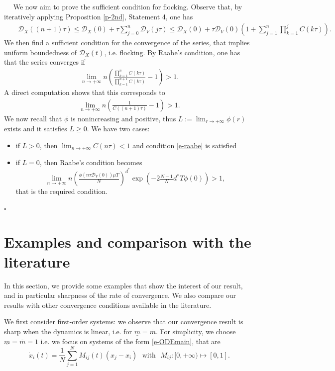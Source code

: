 \documentclass[journal]{article}
\newenvironment{proof}{{\it Proof.}~~}{\hfill$\square$}
\newcommand{\D}{\mathcal{D}}
\begin{document}
\begin{proof}
We now aim to prove the sufficient condition for flocking. Observe that, by iteratively applying Proposition \ref{p-2nd}, Statement 4, one has
\begin{eqnarray*}
&&\D_X((n+1)\tau)\leq \D_X(0)+\tau \sum_{j=0}^n \D_V(j\tau)\leq   \D_X(0)+\tau \D_V(0)\left(1+ \sum_{j=1}^n \prod_{k=1}^j C(k\tau)\right).
\end{eqnarray*}
We then find a sufficient condition for the convergence of the series, that implies uniform boundedness of $\D_X(t)$, i.e. flocking. By Raabe's condition, one has that the series converges if
\begin{eqnarray*}
\lim_{n\to+\infty} n\left(\frac{\prod_{k=1}^n C(k\tau)}{\prod_{k=1}^{n+1} C(k\tau)}-1\right)> 1.
\end{eqnarray*}
A direct computation shows that this corresponds to
\begin{eqnarray}
\label{Raabe-cond}
\lim_{n\to+\infty} n \left(\frac{1}{C((n+1)\tau )}-1\right)>1. \label{e-raabe}
\end{eqnarray}
We now recall that $\phi$ is nonincreasing and positive, thus $L:=\lim_{r\to+\infty} \phi(r)$ exists and it satisfies $L\geq 0$. We have two cases:
\begin{itemize}
\item if $L>0$, then $\lim_{n\to+\infty} C(n\tau )<1$ and condition \eqref{e-raabe} is satisfied
\item if $L=0$, then Raabe's condition becomes
\begin{equation}
\label{e-raabe-L0}
\lim_{n\to+\infty} n  \left( \tfrac{\phi(n\tau \D_V(0))\mu T}{N}    \right)^{d^*}\exp(-2\tfrac{N-1}{N}d^*T\phi(0))>1,
\end{equation}
that is the required condition.
\end{itemize}
\end{proof}

\section{Examples and comparison with the literature}

\label{s-examples}

In this section, we provide some examples that show the interest of our result, and in particular sharpness of the rate of convergence. We also compare our results with other convergence conditions available in the literature.

We first consider first-order systems: we observe that our convergence result is sharp when the dynamics is linear, i.e. for $\underline{m}=\overline{m}$. For simplicity, we choose $\underline{m}=\overline{m}=1$ i.e. we focus on systems of the form \eqref{e-ODEmain}, that are
\begin{equation}
\dot x_i(t)=\frac{1}{N}\sum_{j=1}^N M_{ij}(t) (x_j-x_i)\mbox{~~with~~}M_{ij}:[0,+\infty)\mapsto [0,1].
 \end{equation}
 
\end{document}
